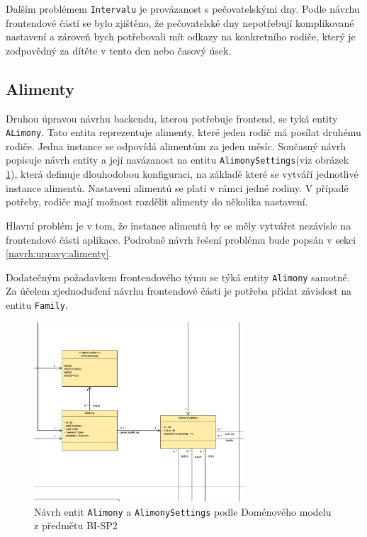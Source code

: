         Dalším problémem \texttt{Intervalu} je provázanost s pečovatelskými dny. Podle návrhu frontendové částí se bylo zjištěno, že pečovatelské dny nepotřebují komplikované nastavení a zároveň bych potřebovali mít odkazy na konkretního rodiče, který je zodpovědný za dítěte v tento den nebo časový úsek.
    
    \subsection{Alimenty}
        Druhou úpravou návrhu backendu, kterou potřebuje frontend, se tyká entity \texttt{ALimony}.
        Tato entita reprezentuje alimenty, které jeden rodič má posílat druhému rodiče. Jedna instance se odpovídá alimentům za jeden měsíc. Současný návrh popisuje návrh entity a její navázanost na entitu \texttt{AlimonySettings}(viz obrázek \ref{image:aliomny-draft1}), která definuje dlouhodobou konfiguraci, na základě které se vytváří jednotlivé instance alimentů. Nastavení alimentů se platí v rámci jedné rodiny. V případě potřeby, rodiče mají možnost rozdělit alimenty do několika nastavení. 
        
        Hlavní problém je v tom, že instance alimentů by se měly vytvářet nezávisle na frontendové části aplikace. Podrobně návrh řešení problému bude popsán v sekci \ref{navrh:upravy:alimenty}.
        
        Dodatečným požadavkem frontendového týmu se týká entity \texttt{Alimony} samotné. Za účelem zjednoduďení návrhu frontendové části je potřeba přidat závislost na entitu \texttt{Family}. %
        \begin{figure}\centering
	        \includegraphics[width=0.7\textwidth]{pdfs/AlimonyDraft1}
	        \caption[Návrh \texttt{Alimony} a \texttt{AlimonySettings}]{Návrh entit \texttt{Alimony} a \texttt{AlimonySettings} podle Doménového modelu z předmětu BI-SP2}\label{image:aliomny-draft1}
        \end{figure}
        

